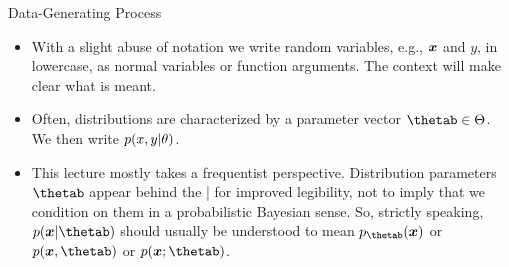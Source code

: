 \documentclass[11pt,compress,t,notes=noshow, xcolor=table]{beamer}
\begin{document}
\begin{vbframe}{Data-Generating Process}
\begin{itemize}

  \item With a slight abuse of notation we write random variables, e.g., $\bm{x}$ 
  and $y$, in lowercase, as normal variables or function arguments. The context 
  will make clear what is meant.
  
  \item Often, distributions are characterized by a parameter vector 
  $\thetab \in \Theta$. We then write $p(x, y | \theta)$.
  
  \item This lecture mostly takes a frequentist perspective. Distribution 
  parameters $\thetab$ appear behind the | for improved legibility, not to imply 
  that we condition on them in a probabilistic Bayesian sense.
  So, strictly speaking, $p(\xv | \thetab)$ should usually be understood to mean 
  $p_{\thetab}(\xv)$ or $p(\xv, \thetab)$ or $p(\xv; \thetab)$.

\end{itemize}

\end{vbframe}


\endlecture
\end{document}
